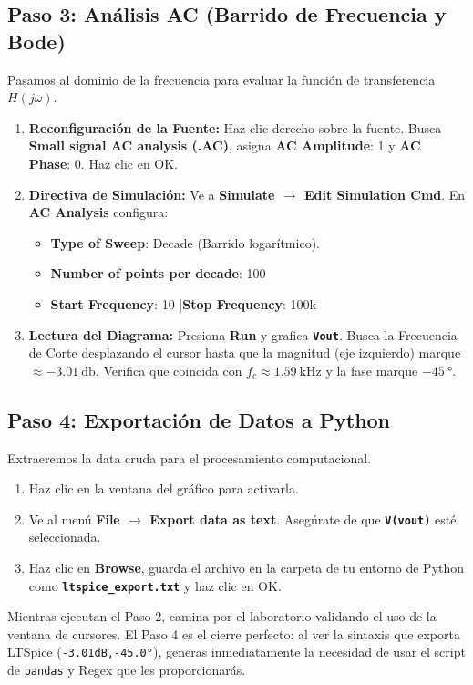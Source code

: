 \documentclass[11pt,a4paper]{article}
\newcommand{\tecla}[1]{\colorbox{gray!20}{\texttt{\footnotesize\textbf{#1}}}}
\newcommand{\menu}[1]{\textbf{\textsf{#1}}}
\begin{document}
\subsection*{Paso 3: Análisis AC (Barrido de Frecuencia y Bode)}
Pasamos al dominio de la frecuencia para evaluar la función de transferencia $H(j\omega)$.
\begin{enumerate}
    \item \textbf{Reconfiguración de la Fuente:} Haz clic derecho sobre la fuente. Busca \menu{Small signal AC analysis (.AC)}, asigna \menu{AC Amplitude}: 1 y \menu{AC Phase}: 0. Haz clic en OK.
    \item \textbf{Directiva de Simulación:} Ve a \menu{Simulate $\rightarrow$ Edit Simulation Cmd}. En \menu{AC Analysis} configura:
    \begin{itemize}[label=\raisebox{0.25ex}{\tiny$\bullet$}]
        \item \menu{Type of Sweep}: Decade (Barrido logarítmico).
        \item \menu{Number of points per decade}: 100
        \item \menu{Start Frequency}: 10 \quad|\quad \menu{Stop Frequency}: 100k
    \end{itemize}
    \item \textbf{Lectura del Diagrama:} Presiona \menu{Run} y grafica \tecla{Vout}. Busca la Frecuencia de Corte desplazando el cursor hasta que la magnitud (eje izquierdo) marque $\approx \qty{-3.01}{\decibel}$. Verifica que coincida con $f_c \approx \qty{1.59}{\kilo\hertz}$ y la fase marque $\qty{-45}{\degree}$.
\end{enumerate}

\subsection*{Paso 4: Exportación de Datos a Python}
Extraeremos la data cruda para el procesamiento computacional.
\begin{enumerate}
    \item Haz clic en la ventana del gráfico para activarla.
    \item Ve al menú \menu{File $\rightarrow$ Export data as text}. Asegúrate de que \tecla{V(vout)} esté seleccionada.
    \item Haz clic en \menu{Browse}, guarda el archivo en la carpeta de tu entorno de Python como \tecla{ltspice\_export.txt} y haz clic en OK.
\end{enumerate}

\vspace{0.5cm}
\begin{tcolorbox}[colback=green!5, colframe=green!40!black, title=\textbf{Dinámica Docente (Cierre de Sesión)}]
Mientras ejecutan el Paso 2, camina por el laboratorio validando el uso de la ventana de cursores. El Paso 4 es el cierre perfecto: al ver la sintaxis que exporta LTSpice (\texttt{-3.01dB,-45.0°}), generas inmediatamente la necesidad de usar el script de \texttt{pandas} y Regex que les proporcionarás.
\end{tcolorbox}
\end{document}

